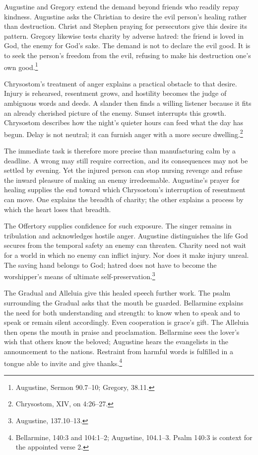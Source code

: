 Augustine and Gregory extend the demand beyond friends who readily
repay kindness. Augustine asks the Christian to desire the evil
person's healing rather than destruction. Christ and Stephen praying
for persecutors give this desire its pattern. Gregory likewise
tests charity by adverse hatred: the friend is loved in God, the
enemy for God's sake. The demand is not to declare the evil good.
It is to seek the person's freedom from the evil, refusing to make
his destruction one's own good.\footnote{Augustine, Sermon 90.7--10;
Gregory,  38.11.}

Chrysostom's treatment of anger explains a practical obstacle to
that desire. Injury is rehearsed, resentment grows, and hostility
becomes the judge of ambiguous words and deeds. A slander then
finds a willing listener because it fits an already cherished
picture of the enemy. Sunset interrupts this growth. Chrysostom
describes how the night's quieter hours can feed what the day
has begun. Delay is not neutral; it can furnish anger with a more
secure dwelling.\footnote{Chrysostom,  XIV,
on 4:26--27.}

The immediate task is therefore more precise than manufacturing
calm by a deadline. A wrong may still require correction, and its
consequences may not be settled by evening. Yet the injured person
can stop nursing revenge and refuse the inward pleasure of making
an enemy irredeemable. Augustine's prayer for healing supplies
the end toward which Chrysostom's interruption of resentment can
move. One explains the breadth of charity; the other explains a
process by which the heart loses that breadth.

The Offertory supplies confidence for such exposure. The singer
remains in tribulation and acknowledges hostile anger. Augustine
distinguishes the life God secures from the temporal safety an
enemy can threaten. Charity need not wait for a world in which
no enemy can inflict injury. Nor does it make injury unreal.
The saving hand belongs to God; hatred does not have to become
the worshipper's means of ultimate self-preservation.\footnote{Augustine,
 137.10--13.}

The Gradual and Alleluia give this healed speech further work.
The psalm surrounding the Gradual asks that the mouth be guarded.
Bellarmine explains the need for both understanding and strength:
to know when to speak and to speak or remain silent accordingly.
Even cooperation is grace's gift. The Alleluia then opens the
mouth in praise and proclamation. Bellarmine sees the lover's
wish that others know the beloved; Augustine hears the evangelists
in the announcement to the nations. Restraint from harmful words
is fulfilled in a tongue able to invite and give thanks.\footnote{Bellarmine,
 140:3 and 104:1--2; Augustine, 
104.1--3. Psalm 140:3 is context for the appointed verse 2.}

